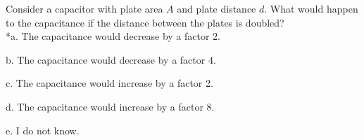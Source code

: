 
Consider a capacitor with plate area \(A\) and plate distance \(d\). What
would happen to the capacitance if the distance between the plates is doubled?\\

*a. The capacitance would decrease by a factor 2.

b. The capacitance would decrease by a factor 4.

c. The capacitance would increase by a factor 2.

d. The capacitance would increase by a factor 8.

e. I do not know.\\
